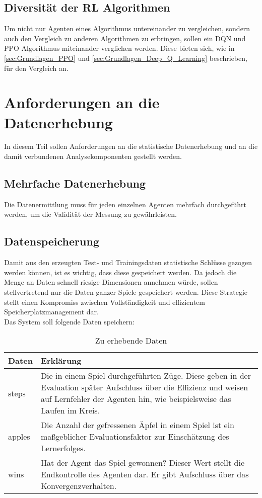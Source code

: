 \subsection{Diversität der RL Algorithmen} \label{subsec:Anforderungen_Diversität}
Um nicht nur Agenten eines Algorithmus untereinander zu vergleichen, sondern auch den Vergleich zu anderen Algorithmen zu erbringen, sollen ein DQN und PPO Algorithmus miteinander verglichen werden. 
Diese bieten sich, wie in \autoref{sec:Grundlagen_PPO} und \autoref{sec:Grundlagen_Deep_Q_Learning} beschrieben, für den Vergleich an.

\section{Anforderungen an die Datenerhebung} \label{sec:Anforderungen_an_die_Datenerhebung}
In diesem Teil sollen Anforderungen an die statistische Datenerhebung und an die damit verbundenen Analysekomponenten gestellt werden.

\subsection{Mehrfache Datenerhebung} \label{subsec:Anforderungen_mehrfache_Datenerhebung}
Die Datenermittlung muss für jeden einzelnen Agenten mehrfach durchgeführt werden, um die Validität der Messung zu gewährleisten. \citep[S. 135]{DL}

\subsection{Datenspeicherung} \label{subsec:Anforderungen_Datenspeicherung}
Damit aus den erzeugten Test- und Trainingsdaten statistische Schlüsse gezogen werden können, ist es wichtig, dass diese gespeichert werden. Da jedoch die Menge an Daten schnell riesige Dimensionen annehmen würde, sollen stellvertretend nur die Daten ganzer Spiele gespeichert werden. Diese Strategie stellt einen Kompromiss zwischen Vollständigkeit und effizientem Speicherplatzmanagement dar.\\
Das System soll folgende Daten speichern:
\begin{longtable}[h]{|p{4cm}|p{\linewidth - 5cm}|}
	\caption{Zu erhebende Daten}
	\label{tab:Anforderungen_Datenerhebung} 
	\endfirsthead
	\endhead
	\hline
	Daten & Erklärung \\
	\hline
	steps & Die in einem Spiel durchgeführten Züge. Diese geben in der Evaluation später Aufschluss über die Effizienz und weisen auf Lernfehler der Agenten hin, wie beispielsweise das Laufen im Kreis.\\
	\hline
	apples & Die Anzahl der gefressenen Äpfel in einem Spiel ist ein maßgeblicher Evaluationsfaktor zur Einschätzung des Lernerfolges.\\
	\hline
	wins & Hat der Agent das Spiel gewonnen? Dieser Wert stellt die Endkontrolle des Agenten dar. Er gibt Aufschluss über das Konvergenzverhalten.\\
	\hline
\end{longtable}

